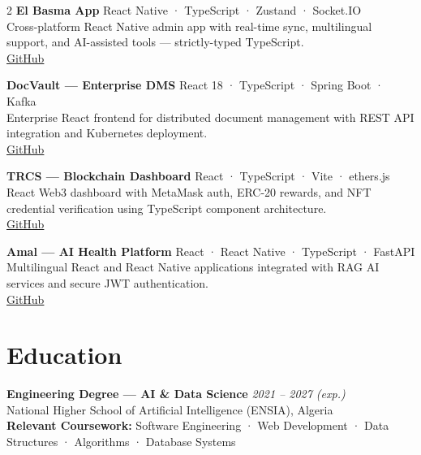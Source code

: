 \documentclass[8.5pt, letterpaper]{extarticle}
\begin{document}
\begin{multicols}{2}
{\bfseries\small El Basma App} \hfill {\small React Native · TypeScript · Zustand · Socket.IO}\\
Cross-platform React Native admin app with real-time sync, multilingual support, and AI-assisted tools — strictly-typed TypeScript.\\[-1pt]
{\small {}\;\href{https://github.com/Samir-Guenchi/el-basma-app}{\color{blue}GitHub}}
\vspace{3pt}

{\bfseries\small DocVault — Enterprise DMS} \hfill {\small React 18 · TypeScript · Spring Boot · Kafka}\\
Enterprise React frontend for distributed document management with REST API integration and Kubernetes deployment.\\[-1pt]
{\small {}\;\href{https://github.com/Samir-Guenchi/DocVault}{\color{blue}GitHub}}
\vspace{3pt}

{\bfseries\small TRCS — Blockchain Dashboard} \hfill {\small React · TypeScript · Vite · ethers.js}\\
React Web3 dashboard with MetaMask auth, ERC-20 rewards, and NFT credential verification using TypeScript component architecture.\\[-1pt]
{\small {}\;\href{https://github.com/Samir-Guenchi/Tokenized-Reward-Credential-System}{\color{blue}GitHub}}
\vspace{3pt}

{\bfseries\small Amal — AI Health Platform} \hfill {\small React · React Native · TypeScript · FastAPI}\\
Multilingual React and React Native applications integrated with RAG AI services and secure JWT authentication.\\[-1pt]
{\small {}\;\href{https://github.com/Samir-Guenchi/Amal}{\color{blue}GitHub}}

\vspace{4pt}

\section{Education}

\textbf{Engineering Degree — AI \& Data Science} \hfill \textit{2021 – 2027 (exp.)}\\
{\small National Higher School of Artificial Intelligence (ENSIA), Algeria}\\
{\small \textbf{Relevant Coursework:} Software Engineering · Web Development · Data Structures · Algorithms · Database Systems}

\end{multicols}
\end{document}

